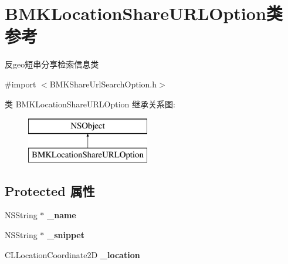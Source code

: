 \hypertarget{interface_b_m_k_location_share_u_r_l_option}{}\section{B\+M\+K\+Location\+Share\+U\+R\+L\+Option类 参考}
\label{interface_b_m_k_location_share_u_r_l_option}


反geo短串分享检索信息类  




{\ttfamily \#import $<$B\+M\+K\+Share\+Url\+Search\+Option.\+h$>$}

类 B\+M\+K\+Location\+Share\+U\+R\+L\+Option 继承关系图\+:\begin{figure}[H]
\begin{center}
\leavevmode
\includegraphics[height=2.000000cm]{interface_b_m_k_location_share_u_r_l_option}
\end{center}
\end{figure}
\subsection*{Protected 属性}
\begin{DoxyCompactItemize}
\item 
\hypertarget{interface_b_m_k_location_share_u_r_l_option_aa7590ba3b21f55434f5854778974b9c4}{}N\+S\+String $\ast$ {\bfseries \+\_\+name}\label{interface_b_m_k_location_share_u_r_l_option_aa7590ba3b21f55434f5854778974b9c4}

\item 
\hypertarget{interface_b_m_k_location_share_u_r_l_option_a455c7467cf0814dbe3219e7ed596b38a}{}N\+S\+String $\ast$ {\bfseries \+\_\+snippet}\label{interface_b_m_k_location_share_u_r_l_option_a455c7467cf0814dbe3219e7ed596b38a}

\item 
\hypertarget{interface_b_m_k_location_share_u_r_l_option_a67aa843182abf143e68a89d9fbe3441c}{}C\+L\+Location\+Coordinate2\+D {\bfseries \+\_\+location}\label{interface_b_m_k_location_share_u_r_l_option_a67aa843182abf143e68a89d9fbe3441c}

\end{DoxyCompactItemize}
